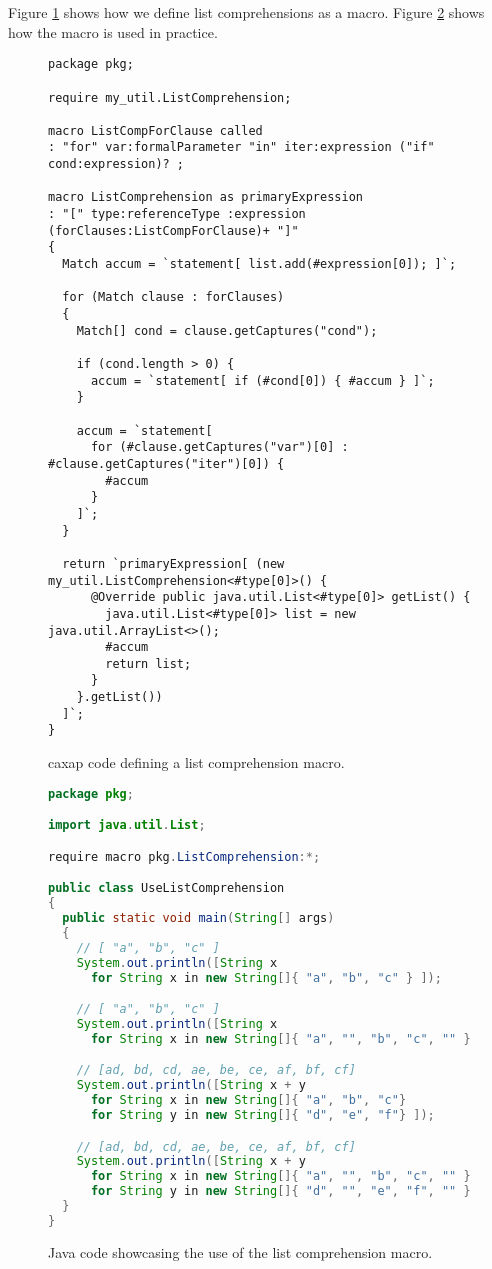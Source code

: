 Figure \ref{list_comprehension_def} shows how we define list comprehensions as a
macro. Figure \ref{list_comprehension_use} shows how the macro is used in
practice.

\begin{figure}[here]
\small
\begin{lstlisting}[language=caxap, frame=single]
package pkg;

require my_util.ListComprehension;

macro ListCompForClause called
: "for" var:formalParameter "in" iter:expression ("if" cond:expression)? ;

macro ListComprehension as primaryExpression
: "[" type:referenceType :expression (forClauses:ListCompForClause)+ "]"
{
  Match accum = `statement[ list.add(#expression[0]); ]`;

  for (Match clause : forClauses)
  {
    Match[] cond = clause.getCaptures("cond");

    if (cond.length > 0) {
      accum = `statement[ if (#cond[0]) { #accum } ]`;
    }

    accum = `statement[
  	  for (#clause.getCaptures("var")[0] : #clause.getCaptures("iter")[0]) {
  	    #accum
  	  }
    ]`;
  }

  return `primaryExpression[ (new my_util.ListComprehension<#type[0]>() {
      @Override public java.util.List<#type[0]> getList() {
        java.util.List<#type[0]> list = new java.util.ArrayList<>();
        #accum
        return list;
      }
    }.getList())
  ]`;
}
\end{lstlisting}
\caption{caxap code defining a list comprehension macro.}
\label{list_comprehension_def}
\end{figure}

\begin{figure}[here]
\small
\begin{lstlisting}[language=Java, frame=single]
package pkg;

import java.util.List;

require macro pkg.ListComprehension:*;

public class UseListComprehension
{
  public static void main(String[] args)
  {
    // [ "a", "b", "c" ]
    System.out.println([String x
      for String x in new String[]{ "a", "b", "c" } ]);

    // [ "a", "b", "c" ]
    System.out.println([String x
      for String x in new String[]{ "a", "", "b", "c", "" } if !x.isEmpty() ]);

    // [ad, bd, cd, ae, be, ce, af, bf, cf]
    System.out.println([String x + y
      for String x in new String[]{ "a", "b", "c"}
      for String y in new String[]{ "d", "e", "f"} ]);

    // [ad, bd, cd, ae, be, ce, af, bf, cf]
    System.out.println([String x + y
      for String x in new String[]{ "a", "", "b", "c", "" } if !x.isEmpty()
      for String y in new String[]{ "d", "", "e", "f", "" } if !y.isEmpty() ]);
  }
}
\end{lstlisting}
\caption{Java code showcasing the use of the list comprehension macro.}
\label{list_comprehension_use}
\end{figure}